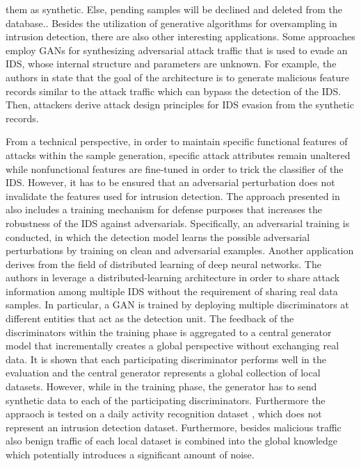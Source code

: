 \documentclass[../../main.tex]{subfiles}
\begin{document}
them as synthetic. Else, pending samples will be declined and deleted from the database.. Besides the utilization of generative algorithms for oversampling in intrusion detection, there are also other interesting applications. Some approaches employ GANs for synthesizing adversarial attack traffic that is used to evade an IDS, whose internal structure and parameters are unknown. For example, the authors in \cite{lin2022idsgan} state that the goal of the architecture is to generate malicious feature records similar to the attack traffic which can bypass the detection of the IDS. Then, attackers derive attack design principles for IDS evasion from the synthetic records.

From a technical perspective, in order to maintain specific functional features of attacks within the sample generation, specific attack attributes remain unaltered while nonfunctional features are fine-tuned in order to trick the classifier of the IDS. However, it has to be ensured that an adversarial perturbation does not invalidate the features used for intrusion detection. The approach presented in \cite{usama2019generative} also includes a training mechanism for defense purposes that increases the robustness of the IDS against adversarials. Specifically, an adversarial training \cite{szegedy2013intriguing} is conducted, in which the detection model learns the possible adversarial perturbations by training on clean and adversarial examples. Another application derives from the field of distributed learning of deep neural networks. The authors in \cite{ferdowsi2019generative} leverage a distributed-learning architecture in order to share attack information among multiple IDS without the requirement of sharing real data samples. In particular, a GAN is trained by deploying multiple discriminators at different entities that act as the detection unit. The feedback of the discriminators within the training phase is aggregated to a central generator model that incrementally creates a global perspective without exchanging real data. It is shown that each participating discriminator performs well in the evaluation and the central generator represents a global collection of local datasets. However, while in the training phase, the generator has to send synthetic data to each of the participating discriminators. Furthermore the appraoch is tested on a daily activity recognition dataset \cite{reyes2016transition}, which does not represent an intrusion detection dataset. Furthermore, besides malicious traffic also benign traffic of each local dataset is combined into the global knowledge which potentially introduces a significant amount of noise. 
\end{document}
